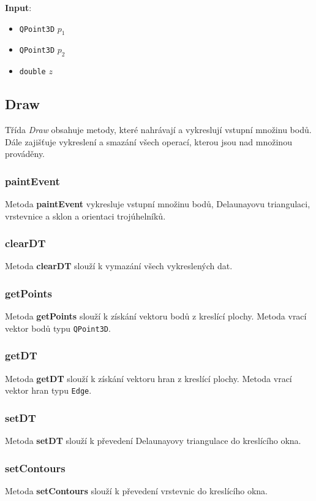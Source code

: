 \documentclass[a4paper, 12pt]{article}
\begin{document}
\textbf{Input}:
\begin{itemize}
\item \texttt{QPoint3D} $p_1$ 
\item \texttt{QPoint3D} $p_2$ 
\item \texttt{double} $z$ 
\end{itemize}

\subsection{Draw}
Třída \textit{Draw} obsahuje metody, které nahrávají a vykreslují vstupní množinu bodů. Dále zajišťuje vykreslení a smazání všech operací, kterou jsou nad množinou prováděny.

\subsubsection*{paintEvent}
Metoda \textbf{paintEvent} vykresluje vstupní množinu bodů, Delaunayovu triangulaci, vrstevnice a sklon a orientaci trojúhelníků.

\subsubsection*{clearDT}
Metoda \textbf{clearDT} slouží k vymazání všech vykreslených dat.

\subsubsection*{getPoints}
Metoda \textbf{getPoints} slouží k získání vektoru bodů z kreslící plochy. Metoda vrací vektor bodů typu \texttt{QPoint3D}.

\subsubsection*{getDT}
Metoda \textbf{getDT} slouží k získání vektoru hran z kreslící plochy. Metoda vrací vektor hran typu \texttt{Edge}.

\subsubsection*{setDT}
Metoda \textbf{setDT} slouží k převedení Delaunayovy triangulace do kreslícího okna.

\subsubsection*{setContours}
Metoda \textbf{setContours} slouží k převedení vrstevnic do kreslícího okna.
\end{document}
